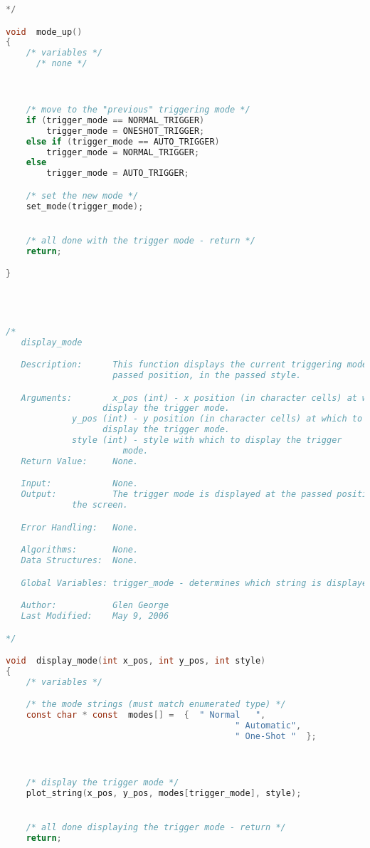 \begin{lstlisting}[language=C]
*/

void  mode_up()
{
    /* variables */
      /* none */



    /* move to the "previous" triggering mode */
    if (trigger_mode == NORMAL_TRIGGER)
        trigger_mode = ONESHOT_TRIGGER;
    else if (trigger_mode == AUTO_TRIGGER)
        trigger_mode = NORMAL_TRIGGER;
    else
        trigger_mode = AUTO_TRIGGER;

    /* set the new mode */
    set_mode(trigger_mode);


    /* all done with the trigger mode - return */
    return;

}




/*
   display_mode

   Description:      This function displays the current triggering mode at the
                     passed position, in the passed style.

   Arguments:        x_pos (int) - x position (in character cells) at which to
   				   display the trigger mode.
   		     y_pos (int) - y position (in character cells) at which to
   				   display the trigger mode.
		     style (int) - style with which to display the trigger
		     		   mode.
   Return Value:     None.

   Input:            None.
   Output:           The trigger mode is displayed at the passed position on
   		     the screen.

   Error Handling:   None.

   Algorithms:       None.
   Data Structures:  None.

   Global Variables: trigger_mode - determines which string is displayed.

   Author:           Glen George
   Last Modified:    May 9, 2006

*/

void  display_mode(int x_pos, int y_pos, int style)
{
    /* variables */

    /* the mode strings (must match enumerated type) */
    const char * const  modes[] =  {  " Normal   ",
                                             " Automatic",
                                             " One-Shot "  };



    /* display the trigger mode */
    plot_string(x_pos, y_pos, modes[trigger_mode], style);


    /* all done displaying the trigger mode - return */
    return;


\end{lstlisting}
